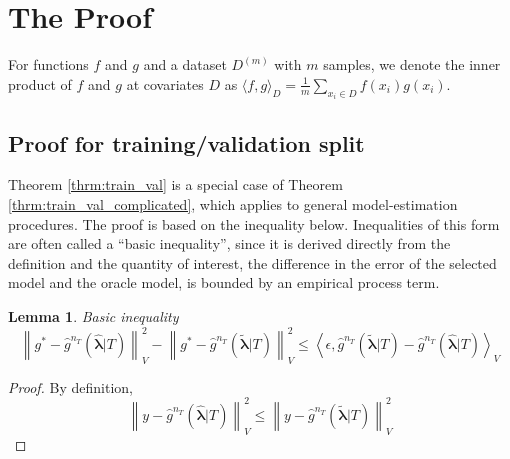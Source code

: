 \documentclass[12pt]{article}
\newtheorem{lemma}{Lemma}
\begin{document}
\section{The Proof} \label{sec:proofs}

For functions $f$ and $g$ and a dataset $D^{(m)}$ with $m$ samples, we denote the inner product of $f$ and $g$ at covariates $D$ as $\langle f,g \rangle_D = \frac{1}{m} \sum_{x_i \in D} f(x_i) g(x_i) $.

\subsection{Proof for training/validation split}

Theorem \ref{thrm:train_val} is a special case of Theorem \ref{thrm:train_val_complicated}, which applies to general model-estimation procedures. The proof is based on the inequality below. Inequalities of this form are often called a ``basic inequality'', since it is derived directly from the definition and the quantity of interest, the difference in the error of the selected model and the oracle model, is bounded by an empirical process term.

\begin{lemma}{Basic inequality}
	\begin{equation}
	\label{thrm:basic_ineq}
	\left \| g^* - \hat{g}^{n_T}(\hat{\boldsymbol{\lambda}}|T) \right \|^2_V 
	- \left \| g^* - \hat{g}^{n_T}(\tilde{\boldsymbol{\lambda}}|T) \right \|^2_V
	\le 
	\left \langle \epsilon, \hat{g}^{n_T}(\tilde{\boldsymbol{\lambda}}|T) - \hat{g}^{n_T}(\hat{\boldsymbol{\lambda}}|T) \right \rangle_V
	\end{equation}
\end{lemma}

\begin{proof}
	By definition,
	\begin{equation}
	\left \| y - \hat{g}^{n_T}(\hat{\boldsymbol{\lambda}}|T) \right \|^2_V \le 
	\left \| y - \hat{g}^{n_T}(\tilde{\boldsymbol{\lambda}}|T) \right \|^2_V
	\end{equation}
\end{proof}
\end{document}
